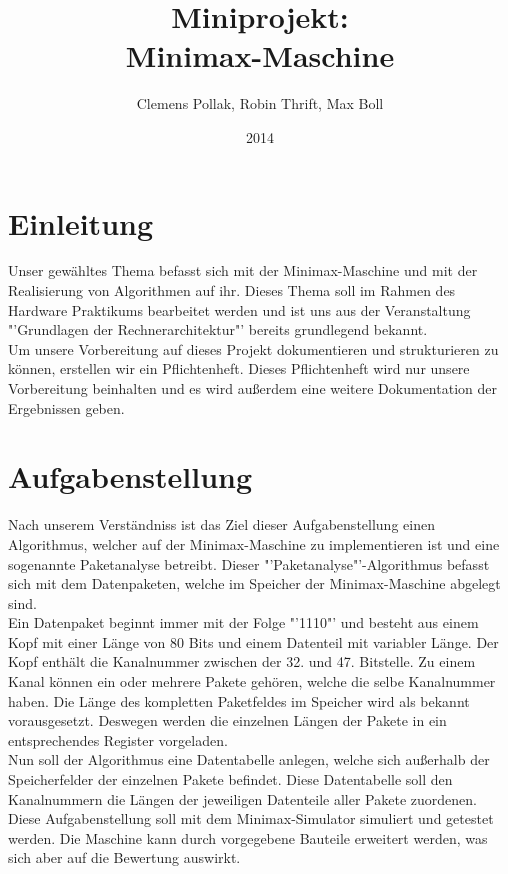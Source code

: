\documentclass[12pt,titlepage]{article}
\begin{document}
\title{Miniprojekt: \\ Minimax-Maschine}
\author{Clemens Pollak, Robin Thrift, Max Boll}
\date{2014}
\maketitle


\section{Einleitung} 
Unser gew{\"a}hltes Thema befasst sich mit der Minimax-Maschine und mit der Realisierung von Algorithmen auf ihr. Dieses Thema soll im Rahmen des Hardware Praktikums bearbeitet werden und ist uns aus der Veranstaltung "'Grundlagen der Rechnerarchitektur"' bereits grundlegend bekannt.\\ Um unsere Vorbereitung auf dieses Projekt dokumentieren und strukturieren zu k{\"o}nnen, erstellen wir ein Pflichtenheft. Dieses Pflichtenheft wird nur unsere Vorbereitung beinhalten und es wird au{\ss}erdem eine weitere Dokumentation der Ergebnissen geben.

\section{Aufgabenstellung}
Nach unserem Verst{\"a}ndniss ist das Ziel dieser Aufgabenstellung einen Algorithmus, welcher auf der Minimax-Maschine zu implementieren ist und eine sogenannte Paketanalyse betreibt. Dieser "'Paketanalyse"'-Algorithmus befasst sich mit dem Datenpaketen, welche im Speicher der Minimax-Maschine abgelegt sind.\\ Ein Datenpaket beginnt immer mit der Folge "'1110"' und besteht aus einem
Kopf mit einer L{\"a}nge von 80 Bits und einem Datenteil mit variabler L{\"a}nge. Der Kopf enth{\"a}lt die Kanalnummer zwischen der 32. und 47. Bitstelle. Zu einem Kanal k{\"o}nnen ein oder mehrere Pakete geh{\"o}ren, welche die selbe Kanalnummer haben.
Die L{\"a}nge des kompletten Paketfeldes im Speicher wird als bekannt vorausgesetzt. Deswegen werden die einzelnen L{\"a}ngen der Pakete in ein entsprechendes Register vorgeladen.\\
Nun soll der Algorithmus eine Datentabelle anlegen, welche sich au{\ss}erhalb der Speicherfelder der einzelnen Pakete befindet. Diese Datentabelle soll den Kanalnummern die L{\"a}ngen der jeweiligen Datenteile aller Pakete zuordenen. Diese Aufgabenstellung soll mit dem Minimax-Simulator simuliert und getestet werden. Die Maschine kann durch vorgegebene Bauteile erweitert werden, was sich aber auf die Bewertung auswirkt.
\end{document}
